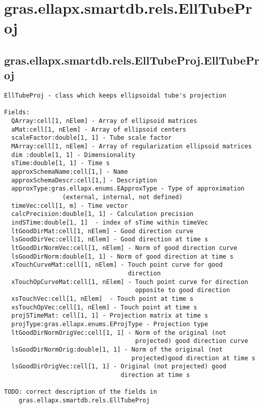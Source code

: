 \section{gras.ellapx.smartdb.rels.EllTubeProj}\label{secClassDescr:gras.ellapx.smartdb.rels.EllTubeProj}
\subsection{\texorpdfstring{gras.ellapx.smartdb.rels.EllTubeProj.EllTubeProj}{EllTubeProj}}\label{method:gras.ellapx.smartdb.rels.EllTubeProj.EllTubeProj}
\begin{verbatim}
EllTubeProj - class which keeps ellipsoidal tube's projection

Fields:
  QArray:cell[1, nElem] - Array of ellipsoid matrices
  aMat:cell[1, nElem] - Array of ellipsoid centers
  scaleFactor:double[1, 1] - Tube scale factor
  MArray:cell[1, nElem] - Array of regularization ellipsoid matrices
  dim :double[1, 1] - Dimensionality
  sTime:double[1, 1] - Time s
  approxSchemaName:cell[1,] - Name
  approxSchemaDescr:cell[1,] - Description
  approxType:gras.ellapx.enums.EApproxType - Type of approximation
                (external, internal, not defined)
  timeVec:cell[1, m] - Time vector
  calcPrecision:double[1, 1] - Calculation precision
  indSTime:double[1, 1]  - index of sTime within timeVec
  ltGoodDirMat:cell[1, nElem] - Good direction curve
  lsGoodDirVec:cell[1, nElem] - Good direction at time s
  ltGoodDirNormVec:cell[1, nElem] - Norm of good direction curve
  lsGoodDirNorm:double[1, 1] - Norm of good direction at time s
  xTouchCurveMat:cell[1, nElem] - Touch point curve for good
                                  direction
  xTouchOpCurveMat:cell[1, nElem] - Touch point curve for direction
                                    opposite to good direction
  xsTouchVec:cell[1, nElem]  - Touch point at time s
  xsTouchOpVec:cell[1, nElem] - Touch point at time s
  projSTimeMat: cell[1, 1] - Projection matrix at time s
  projType:gras.ellapx.enums.EProjType - Projection type
  ltGoodDirNormOrigVec:cell[1, 1] - Norm of the original (not
                                    projected) good direction curve
  lsGoodDirNormOrig:double[1, 1] - Norm of the original (not
                                   projected)good direction at time s
  lsGoodDirOrigVec:cell[1, 1] - Original (not projected) good
                                direction at time s

TODO: correct description of the fields in
    gras.ellapx.smartdb.rels.EllTubeProj
\end{verbatim}


